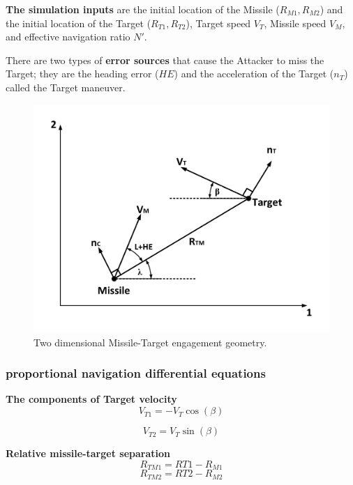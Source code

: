 \textbf{The simulation inputs} are the initial location of the Missile ($R_{M1}, R_{M2}$) and the initial location of the Target ($R_{T1}, R_{T2}$), Target speed $V_T$, Missile speed $V_M$, and effective navigation ratio $N'$.

There are two types of \textbf{error sources} that cause the Attacker to miss the Target; they are the heading error ($HE$) and the acceleration of the Target ($n_T$) called the Target maneuver.

\begin{figure}[htb]
	\centering
	\includegraphics[scale = 0.65]{fig/PN.pdf}
	\caption{Two dimensional Missile-Target engagement geometry.}
	\label{PN}
\end{figure}


\subsubsection*{proportional navigation differential equations}

\textbf{The components of Target velocity} 
\begin{equation}
V_{T1} = - V_T \cos(\beta)
\end{equation}

\begin{equation}
V_{T2} =  V_T \sin(\beta)
\end{equation}

\textbf{Relative missile-target separation}
\begin{equation}
R_{TM1} = R{T1} - R_{M1}
\end{equation}
\begin{equation}
R_{TM2} = R{T2} - R_{M2}
\end{equation}

